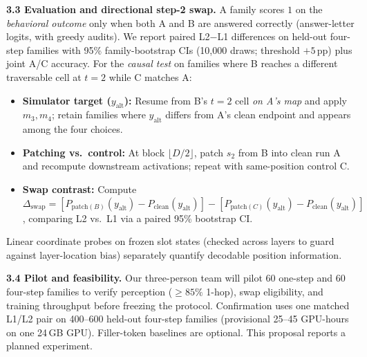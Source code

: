 \documentclass{article}
\begin{document}
\textbf{3.3 Evaluation and directional step-2 swap.} A family scores $1$ on the \emph{behavioral outcome} only when both A and B are answered correctly (answer-letter logits, with greedy audits). We report paired L2$-$L1 differences on held-out four-step families with 95\% family-bootstrap CIs (10,000 draws; threshold $+5$\,pp) plus joint A/C accuracy. For the \emph{causal test} on families where B reaches a different traversable cell at $t{=}2$ while C matches A:
\begin{itemize}[nosep,leftmargin=1.3em]
  \item \textbf{Simulator target ($y_{\text{alt}}$):} Resume from B's $t{=}2$ cell \emph{on A's map} and apply $m_3, m_4$; retain families where $y_{\text{alt}}$ differs from A's clean endpoint and appears among the four choices.
  \item \textbf{Patching vs.\ control:} At block $\lfloor D/2 \rfloor$, patch $s_2$ from B into clean run A and recompute downstream activations; repeat with same-position control C.
  \item \textbf{Swap contrast:} Compute $\Delta_{\text{swap}} = [P_{\text{patch}(B)}(y_{\text{alt}}) - P_{\text{clean}}(y_{\text{alt}})] - [P_{\text{patch}(C)}(y_{\text{alt}}) - P_{\text{clean}}(y_{\text{alt}})]$, comparing L2 vs.\ L1 via a paired 95\% bootstrap CI.
\end{itemize}
Linear coordinate probes on frozen slot states (checked across layers to guard against layer-location bias) separately quantify decodable position information.

\textbf{3.4 Pilot and feasibility.} Our three-person team will pilot 60 one-step and 60 four-step families to verify perception ($\ge 85\%$ 1-hop), swap eligibility, and training throughput before freezing the protocol. Confirmation uses one matched L1/L2 pair on 400--600 held-out four-step families (provisional 25--45 GPU-hours on one 24\,GB GPU). Filler-token baselines are optional. This proposal reports a planned experiment.

\setlength{\bibsep}{0.5pt}
{\scriptsize


}
\end{document}
